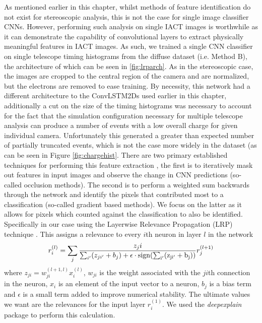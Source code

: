 As mentioned earlier in this chapter, whilst methods of feature identification do not exist for stereoscopic analysis, this is not the case for single image classifier CNNs. However, performing such analysis on single IACT images is worthwhile as it can demonstrate the capability of convolutional layers to extract physically meaningful features in IACT images. As such, we trained a single CNN classifier on single telescope timing histograms from the diffuse dataset (i.e. Method B), the architecture of which can be seen in \ref{fig:lrparch}. As in the stereoscopic case, the images are cropped to the central region of the camera and are normalized, but the electrons are removed to ease training. By necessity, this network had a different architecture to the ConvLSTM2Ds used earlier in this chapter, additionally a cut on the size of the timing histograms was necessary to account for the fact that the simulation configuration necessary for multiple telescope analysis can produce a number of events with a low overall charge for given individual camera. Unfortunately this generated a greater than expected number of partially truncated events, which is not the case more widely in the dataset (as can be seen in Figure \ref{fig:chargehist}. There are two primary established techniques for performing this feature extraction \cite{deepexplain}, the first is to iteratively mask out features in input images and observe the change in CNN predictions (so-called occlusion methods). The second is to perform a weighted sum backwards through the network and identify the pixels that contributed most to a classification (so-called gradient based methods). We focus on the latter as it allows for pixels which counted against the classification to also be identified. Specifically in our case using the Layerwise Relevance Propagation (LRP) technique \cite{LRP}. This assigns a relevance to every $i$th neuron in layer $l$ in the network
\begin{equation}
r^{(l)}_i=\sum_j\frac{z_ji}{\sum_{i'}(z_{ji'}+b_j)+\epsilon\cdot\rm{sign}(\sum_{i'}(z_{ji'}+b_j))}r_j^{(l+1)}
\end{equation}
where $z_{ji}=w_{ji}^{(l+1,l)}x_i^{(l)}$, $w_{ji}$ is the weight associated with the $ji$th connection in the neuron, $x_i$ is an element of the input vector to a neuron, $b_j$ is a bias term and $\epsilon$ is a small term added to improve numerical stability. The ultimate values we want are the relevances for the input layer $r_i^{(1)}$. We used the \textit{deepexplain} package to perform this calculation.

